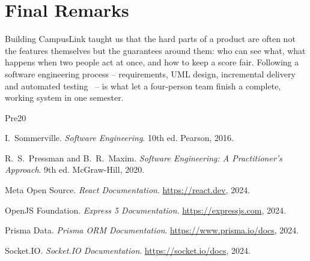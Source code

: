 \documentclass[twoside,12pt]{tietreport}
\begin{document}
\section{Final Remarks}

Building CampusLink taught us that the hard parts of a product are often not the
features themselves but the guarantees around them: who can see what, what happens
when two people act at once, and how to keep a score fair. Following a software
engineering process -- requirements, UML design, incremental delivery and
automated testing~\cite{pressman} -- is what let a four-person team finish a
complete, working system in one semester.

\clearpage
{}
\begin{thebibliography}{Pre20}

I.~Sommerville. \emph{Software Engineering}. 10th ed. Pearson, 2016.

R.~S.~Pressman and B.~R.~Maxim. \emph{Software Engineering: A Practitioner's
Approach}. 9th ed. McGraw-Hill, 2020.

Meta Open Source. \emph{React Documentation}. \url{https://react.dev}, 2024.

OpenJS Foundation. \emph{Express 5 Documentation}. \url{https://expressjs.com},
2024.

Prisma Data. \emph{Prisma ORM Documentation}. \url{https://www.prisma.io/docs},
2024.

Socket.IO. \emph{Socket.IO Documentation}. \url{https://socket.io/docs}, 2024.

\end{thebibliography}
\end{document}
